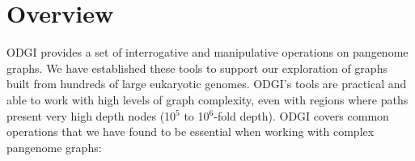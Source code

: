 \documentclass{bioinfo}
\begin{document}

\begin{comment}
key message of the paper is that we have collected a set of algorithms that enable easy use of pangenome graphs for investigating biology
-> build model solves problem of working with big graphs in memory
-> view (convert to GFA) & paths solve problem of exporting basic features of the graph (e.g. paths)
-> stats (understand basic size / structure) & bin & degree & depth solves problem of understanding the overall structure and size of the graph
-> sort (groom) & layout solves problem of finding latent structure in the pangenome
-> viz & draw provides a human-viewable readout of the graph
-> chop & unchop & squeeze & break & prune & explode lets us break apart or combine the graph nodes and topology
-> position & tips & untangle (jaccard based coordinate conversion) provides a way to map coordinates between any genomes in the graph (e.g. liftover!)
-> extract lets us pull out specific regions of the graph based on path ranges, nodes and positions
\end{comment}



\section{Overview}

ODGI provides a set of interrogative and manipulative operations on pangenome graphs.
We have established these tools to support our exploration of graphs built from hundreds of large eukaryotic genomes.
ODGI's tools are practical and able to work with high levels of graph complexity, even with regions where paths present very high depth nodes (10$^5$ to 10$^6$-fold depth).
ODGI covers common operations that we have found to be essential when working with complex pangenome graphs:
\end{document}
